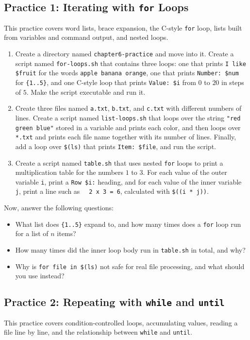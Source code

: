 \subsection{Practice 1: Iterating with \texttt{for} Loops}
This practice covers word lists, brace expansion, the C-style \texttt{for} loop, lists built from variables and command output, and nested loops.

\begin{enumerate}
    \item Create a directory named \texttt{chapter6-practice} and move into it. Create a script named \texttt{for-loops.sh} that contains three loops: one that prints \texttt{I like \$fruit} for the words \texttt{apple banana orange}, one that prints \texttt{Number: \$num} for \texttt{\{1..5\}}, and one C-style loop that prints \texttt{Value: \$i} from $0$ to $20$ in steps of $5$. Make the script executable and run it.
    \item Create three files named \texttt{a.txt}, \texttt{b.txt}, and \texttt{c.txt} with different numbers of lines. Create a script named \texttt{list-loops.sh} that loops over the string \texttt{"red green blue"} stored in a variable and prints each color, and then loops over \texttt{*.txt} and prints each file name together with its number of lines. Finally, add a loop over \texttt{\$(ls)} that prints \texttt{Item: \$file}, and run the script.
    \item Create a script named \texttt{table.sh} that uses nested \texttt{for} loops to print a multiplication table for the numbers $1$ to $3$. For each value of the outer variable \texttt{i}, print a \texttt{Row \$i:} heading, and for each value of the inner variable \texttt{j}, print a line such as \texttt{\ \ 2 x 3 = 6}, calculated with \texttt{\$((i * j))}.
\end{enumerate}

Now, answer the following questions:
\begin{itemize}
    \item What list does \texttt{\{1..5\}} expand to, and how many times does a \texttt{for} loop run for a list of $n$ items?
    \item How many times did the inner loop body run in \texttt{table.sh} in total, and why?
    \item Why is \texttt{for file in \$(ls)} not safe for real file processing, and what should you use instead?
\end{itemize}

\subsection{Practice 2: Repeating with \texttt{while} and \texttt{until}}
This practice covers condition-controlled loops, accumulating values, reading a file line by line, and the relationship between \texttt{while} and \texttt{until}.

